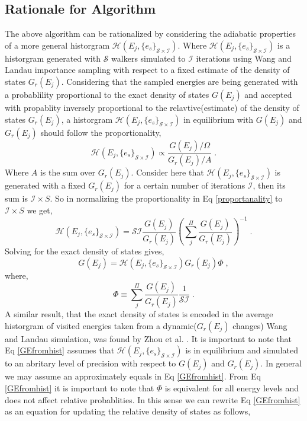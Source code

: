 \documentclass[aps,prl,reprint,superscriptaddress,showkeys]{revtex4-1}
\begin{document}
\subsection{Rationale for Algorithm}

The above algorithm can be rationalized by considering the adiabatic properties of a more general historgram $\mathcal{H}(E_j,\{e_s\}_{\mathcal{S}\times\mathcal{I}})$. Where  $\mathcal{H}(E_j,\{e_s\}_{\mathcal{S}\times\mathcal{I}})$ is a historgram generated with $\mathcal{S}$ walkers simulated to $\mathcal{I}$ iterations using Wang and Landau importance sampling with respect to  a fixed estimate of the density of states $G_r(E_j)$.  Considering that the sampled  energies are being generated with a probablility proportional to  the exact density of states $G(E_j)$ and accepted  with propablity inversely proportional to the relavtive(estimate) of the density of states $G_r(E_j)$, a historgram $\mathcal{H}(E_j,\{e_s\}_{\mathcal{S}\times\mathcal{I}})$ in equilibrium with $G(E_j)$ and $G_r(E_j)$ should follow the proportionality, 
\begin{equation}
\mathcal{H}(E_j,\{e_s\}_{\mathcal{S}\times\mathcal{I}}) \propto   \frac{G(E_j)/\Omega}{G_r(E_j)/A} \; .
\label{proportanality}
\end{equation}
Where $A$ is the sum over $G_r(E_j)$. Consider here that $\mathcal{H}(E_j,\{e_s\}_{\mathcal{S}\times\mathcal{I}})$ is generated with a fixed $G_r(E_j)$ for a certain number of iterations $\mathcal{I}$, then its sum is $\mathcal{I}\times S$.  So in normalizing the proportionality in Eq \ref{proportanality} to $\mathcal{I}\times S$ we get,
\begin{equation}
\mathcal{H}(E_j,\{e_s\}_{\mathcal{S}\times\mathcal{I}}) =  \mathcal{S I}\frac{G(E_j)}{G_r(E_j)}  (\sum_j^{\Pi}\frac{G(E_j)}{G_r(E_j)})^{-1} \;.
\label{dervied_GE_GEr_relationship}
\end{equation}
Solving for the exact density of states gives,
\begin{equation}
G(E_j) = \mathcal{H}(E_j,\{e_s\}_{\mathcal{S}\times\mathcal{I}}) G_r(E_j)  \Phi \;,
\label{GEfromhist}
\end{equation}
where,
\begin{equation}
  \Phi \equiv \sum_j^{\Pi}\frac{G(E_j)}{G_r(E_j)}\frac{1}{\mathcal{S I}} \;. 
 \end{equation}
  A similar result, that the exact density of states is encoded in the average historgram of visited energies taken from a dynamic($G_r(E_j)$ changes) Wang and Landau simulation, was found by Zhou et al. \cite{understand_improve}. It is important to note that Eq \ref{GEfromhist} assumes that $\mathcal{H}(E_j,\{e_s\}_{\mathcal{S}\times\mathcal{I}})$ is in equilibrium and simulated to an abritary level of precision with respect to $G(E_j)$ and $G_r(E_j)$. In general we may assume an approximately equals in Eq \ref{GEfromhist}.  From Eq \ref{GEfromhist} it is important to note that $\Phi$ is equivalent for all energy levels and does not affect relative probablities.  In this sense we can rewrite  Eq \ref{GEfromhist} as an equation for updating the relative density of states as follows, 
\end{document}

